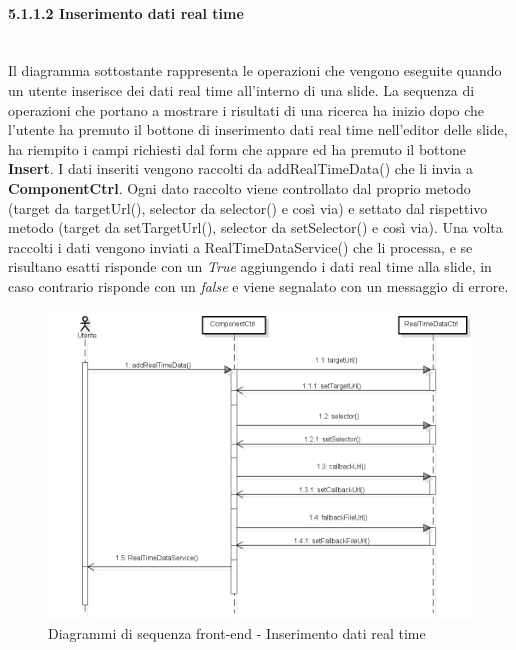 \newpage
\paragraph{5.1.1.2 Inserimento dati real time}\mbox{}\\

\noindent Il diagramma sottostante rappresenta le operazioni che vengono eseguite quando un utente inserisce dei dati real time all'interno di una slide. La sequenza di operazioni che portano a mostrare i risultati di una ricerca ha inizio dopo che l'utente ha premuto il bottone di inserimento dati real time nell'editor delle slide, ha riempito i campi richiesti dal form che appare ed ha premuto il bottone \textbf{Insert}. I dati inseriti vengono raccolti da addRealTimeData() che li invia a \textbf{ComponentCtrl}. Ogni dato raccolto viene controllato dal proprio metodo (target da targetUrl(), selector da selector() e così via) e settato dal rispettivo metodo (target da setTargetUrl(), selector da setSelector() e così via). Una volta raccolti i dati vengono inviati a RealTimeDataService() che li processa, e se risultano esatti risponde con un \textit{True} aggiungendo i dati real time alla slide, in caso contrario risponde con un \textit{false} e viene segnalato con un  messaggio di errore.

\begin{figure}[H] 
	\centering 
	\includegraphics[scale=0.60] {img/realtime.png}
	\caption{Diagrammi di sequenza front-end - Inserimento dati real time} 
\end{figure}